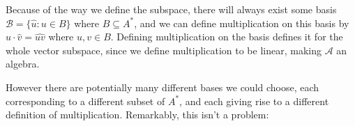 \documentclass[11pt]{report}
\begin{document}
Because of the way we define the subspace, there will always exist some basis $\mathcal{B} = \{\hat{u} : u \in B\}$ where $B \subseteq A^*$, and we can define multiplication on this basis by $\hat{u}\cdot\hat{v} = \widehat{uv}$ where $u,v \in B$. Defining multiplication on the basis defines it for the whole vector subspace, since we define multiplication to be linear, making $\mathcal{A}$ an algebra.

However there are potentially many different bases we could choose, each corresponding to a different subset of $A^*$, and each giving rise to a different definition of multiplication. Remarkably, this isn't a problem:

\end{document}

